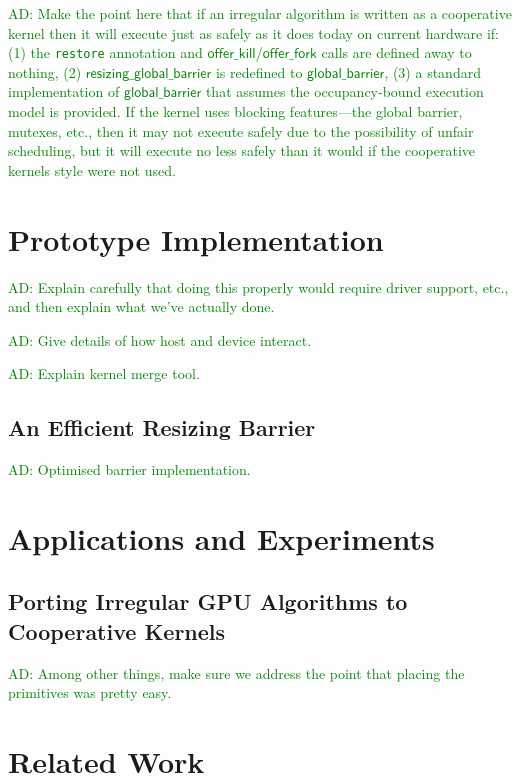 \documentclass[nocopyrightspace]{sigplanconf-pldi16}
\newcommand{\ADComment}[1]{\textcolor{green}{AD: #1}}
\newcommand{\restore}{\texttt{restore}}
\newcommand{\offerfork}{\mathsf{offer\_fork}}
\newcommand{\offerkill}{\mathsf{offer\_kill}}
\newcommand{\globalbarrier}{\mathsf{global\_barrier}}
\newcommand{\resizingglobalbarrier}{\mathsf{resizing\_global\_barrier}}
\begin{document}
\ADComment{Make the point here that if an irregular algorithm is
  written as a cooperative kernel then it will execute just as safely
  as it does today on current hardware if: (1) the \restore
  annotation and $\offerkill$/$\offerfork$ calls are defined away to
  nothing, (2) $\resizingglobalbarrier$ is redefined to
  $\globalbarrier$, (3) a standard implementation of $\globalbarrier$
  that assumes the occupancy-bound execution model is provided.  If the kernel uses blocking features---the global barrier, mutexes, etc., then it may not execute safely due to the possibility of unfair scheduling, but it will execute no less safely than it would if the cooperative kernels style were not used.}


\section{Prototype Implementation}\label{sec:implementation}

\ADComment{Explain carefully that doing this properly would require
  driver support, etc., and then explain what we've actually done.}

\ADComment{Give details of how host and device interact.}

\ADComment{Explain kernel merge tool.}

\subsection{An Efficient Resizing Barrier}\label{sec:resizingbarrier}

\ADComment{Optimised barrier implementation.}



\section{Applications and Experiments}\label{sec:experiments}

\subsection{Porting Irregular GPU Algorithms to Cooperative Kernels}\label{sec:portingalgorithms}

\ADComment{Among other things, make sure we address the point that placing the primitives was pretty easy.}


\section{Related Work}\label{sec:relatedwork}
\end{document}
